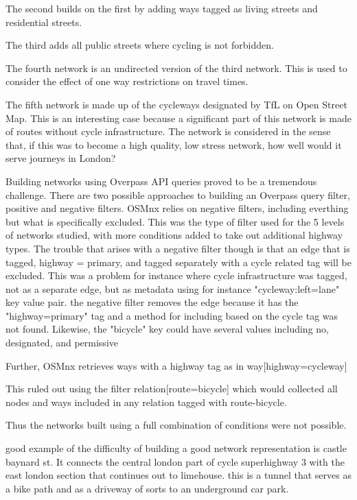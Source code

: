 \documentclass[11pt]{article} %
\begin{document}
The second builds on the first by adding ways tagged as living streets and residential streets.

The third adds all public streets where cycling is not forbidden. 

The fourth network is an undirected version of the third network. This is used to consider the effect of one way restrictions on travel times. 

The fifth network is made up of the cycleways designated by TfL on Open Street Map. This is an interesting case because a significant part of this network is made of routes without cycle infrastructure. The network is considered in the sense that, if this was to become a high quality, low stress network, how well would it serve journeys in London? 

Building networks using Overpass API queries proved to be a tremendous challenge. There are two possible approaches to building an Overpass query filter, positive and negative filters. OSMnx relies on negative filters, including everthing but what is specifically excluded. This was the type of filter used for the 5 levels of networks studied, with more conditions added to take out additional highway types. The trouble that arises with a negative filter though is that an edge that is tagged, highway = primary, and tagged separately with a cycle related tag will be excluded. This was a problem for instance where cycle infrastructure was tagged, not as a separate edge, but as metadata using for instance "cycleway:left=lane" key value pair. the negative filter removes the edge because it has the "highway=primary" tag and a method for including based on the cycle tag was not found. Likewise, the "bicycle" key could have several values including no, designated, and permissive

Further, OSMnx retrieves ways with a highway tag as in way[highway=cycleway]

This ruled out using the filter relation[route=bicycle]  which would collected all nodes and ways included in any relation tagged with route-bicycle. 

Thus the networks built using a  full combination of conditions were not possible. 

good example of the difficulty of building a good network representation is castle baynard st. It connects the central london part of cycle superhighway 3 with the east london section that continues out to limehouse. this is a tunnel that serves as a bike path and as a driveway of sorts to an underground car park. 
\end{document}
